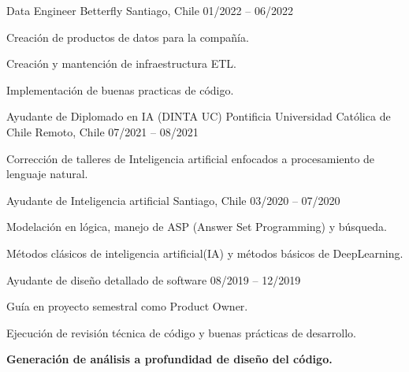 

\begin{cventries}
\cventry
  {Data Engineer} %
  {Betterfly} %
  {Santiago, Chile} %
  {01/2022 – 06/2022} %
  {
    \begin{cvitems} %
      \item {Creación de productos de datos para la compañía.}
      \item {Creación y mantención de infraestructura ETL.}
      \item {Implementación de buenas practicas de código.}
    \end{cvitems}
  }
\cventry
  {Ayudante de Diplomado en IA (DINTA UC)} %
  {Pontificia Universidad Católica de Chile} %
  {Remoto, Chile} %
  {07/2021 – 08/2021} %
  {
    \begin{cvitems} %
      \item {Corrección de talleres de Inteligencia artificial enfocados a procesamiento de lenguaje natural.}
    \end{cvitems}
  }
  \cventry
    {Ayudante de Inteligencia artificial} %
    {} %
    {Santiago, Chile} %
    {03/2020 – 07/2020} %
    {
      \begin{cvitems} %
        \item {Modelación en lógica, manejo de ASP (Answer Set Programming) y búsqueda.}
        \item {Métodos clásicos de inteligencia artificial(IA) y métodos básicos de DeepLearning.}
      \end{cvitems}
    }

  \cventry
    {Ayudante de diseño detallado de software} %
    { } %
    { } %
    {08/2019 – 12/2019} %
    {
      \begin{cvitems} %
        \item {Guía en proyecto semestral como Product Owner.}
        \item {Ejecución de revisión técnica de código y buenas prácticas de desarrollo.}
        \item {\textbf{Generación de análisis a profundidad de diseño del código.}}
      \end{cvitems}
    }


\end{cventries}

